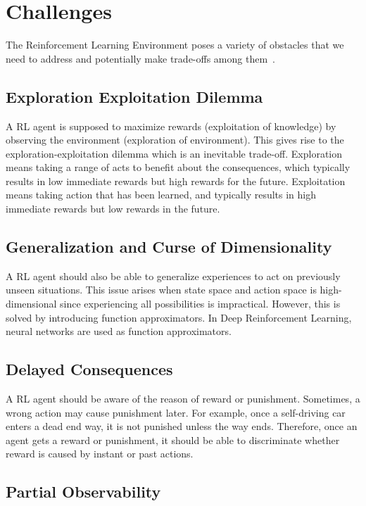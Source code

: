 \section{Challenges}
\label{sec:chal}

The Reinforcement Learning Environment poses a variety of obstacles 
that we need to address and potentially make trade-offs among them~\cite{dulac-arnold_challenges_2019, sutton_reinforcement_1998}.

\subsection{Exploration Exploitation Dilemma}

A RL agent is supposed to maximize rewards (exploitation of knowledge) by observing the environment (exploration of environment). 
This gives rise to the exploration-exploitation dilemma which is an inevitable trade-off. 
Exploration means taking a range of acts to benefit about the consequences, which typically results in low immediate rewards but high rewards for the future. 
Exploitation means taking action that has been learned, and typically results in high immediate rewards but low rewards in the future. 

\subsection{Generalization and Curse of Dimensionality}

A RL agent should also be able to generalize experiences to act on previously unseen situations. 
This issue arises when state space and action space is high-dimensional since experiencing all possibilities is impractical. 
However, this is solved by introducing function approximators. In Deep Reinforcement Learning, neural networks are used as function approximators. 

\subsection{Delayed Consequences}

A RL agent should be aware of the reason of reward or punishment. 
Sometimes, a wrong action may cause punishment later. 
For example, once a self-driving car enters a dead end way, it is not punished unless the way ends. 
Therefore, once an agent gets a reward or punishment, it should be able to discriminate whether reward is caused by instant or past actions. 

\subsection{Partial Observability}

